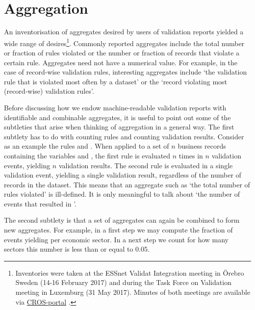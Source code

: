 \section{Aggregation}
\label{sect:aggregation}
An inventorisation of aggregates desired by users of validation reports
yielded a wide range of desires\footnote{Inventories were taken at 
the ESSnet Validat Integration meeting in \"Orebro Sweden (14-16 February 2017) and during
the Task Force on Validation meeting in Luxemburg (31 May 2017). Minutes of both
meetings are available via \href{https://ec.europa.eu/eurostat/cros}{CROS-portal} .}.
Commonly reported aggregates include the total number or fraction of rules
violated or the number or fraction of records  that violate a certain rule.
Aggregates need not have a numerical value. For example, in the case of
record-wise validation rules, interesting aggregates include `the validation
rule that is violated most often by a dataset' or the `record violating most
(record-wise) validation rules'. 

Before discussing how we endow machine-readable validation reports with
identifiable and combinable aggregates, it is useful to point out some of the
subtleties that arise when thinking of aggregation in a general way. The first
subtlety has to do with counting rules and counting validation results.
Consider as an example the rules  and .  When applied to a set of $n$ business records containing the variables
 and , the first rule is evaluated $n$ times in $n$
validation events, yielding $n$ validation results. The second rule is
evaluated in a single validation event, yielding a single validation result,
regardless of the number of records in the dataset. This means that an
aggregate such as `the total number of rules violated' is ill-defined. It is
only meaningful to talk about `the number of events that resulted in
\onwaar{}'. 

The second subtlety is that a set of aggregates can again be combined to form
new aggregates. For example, in a first step we may compute the fraction of
events yielding \onwaar{} per economic sector. In a next step we count for how
many sectors this number is less than or equal to 0.05.

